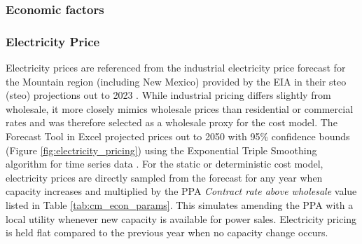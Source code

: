 \subsubsection{Economic factors}\label{ch4:econ_params}

\begin{table}[!htp]
\centering
{}
\caption[Cost model adjustable]{Parameters related to economic factors in the cost model}
\label{tab:cm_econ_params}
\end{table}

\subsubsection{Electricity Price}\label{ch4:elec_price}
Electricity prices are referenced from the industrial electricity price forecast for the Mountain region (including New Mexico) provided by the EIA in their \acrlong{steo} (\acrshort{steo}) projections out to 2023 \citep{eia_short-term_2021}. While industrial pricing differs slightly from wholesale, it more closely mimics wholesale prices than residential or commercial rates and was therefore selected as a wholesale proxy for the cost model. The Forecast Tool in Excel projected prices out to 2050 with 95\% confidence bounds (Figure \ref{fig:electricity_pricing}) using the Exponential Triple Smoothing algorithm for time series data \citep{microsoft_forecastets_2021}. For the static or deterministic cost model, electricity prices are directly sampled from the forecast for any year when capacity increases and multiplied by the PPA \textit{Contract rate above wholesale} value listed in Table \ref{tab:cm_econ_params}. This simulates amending the PPA with a local utility whenever new capacity is available for power sales. Electricity pricing is held flat compared to the previous year when no capacity change occurs.

